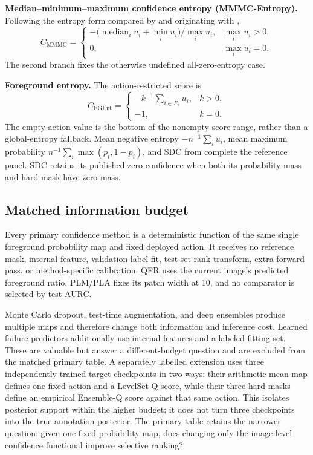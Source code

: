 \noindent\textbf{Median--minimum--maximum confidence entropy (MMMC-Entropy).}
Following the entropy form compared by \citet{sdc} and originating with
\citet{holder2021uncertainty},
\[
 C_{\mathrm{MMMC}}=
 \begin{cases}
 -\bigl(\operatorname{median}_i u_i+\min_i u_i\bigr)/\max_i u_i,
   & \max_i u_i>0,\\
 0, & \max_i u_i=0.
 \end{cases}
\]
The second branch fixes the otherwise undefined all-zero-entropy case.

\noindent\textbf{Foreground entropy.}
The action-restricted score is
\[
 C_{\mathrm{FGEnt}}=
 \begin{cases}
  -k^{-1}\sum_{i\in F_\gamma}u_i, & k>0,\\
  -1, & k=0.
 \end{cases}
\]
The empty-action value is the bottom of the nonempty score range, rather than a
global-entropy fallback. Mean negative entropy
\(-n^{-1}\sum_i u_i\), mean maximum probability
\(n^{-1}\sum_i\max(p_i,1-p_i)\), and SDC from
 complete the reference panel. SDC retains its published
zero confidence when both its probability mass and hard mask have zero mass.

\subsection{Matched information budget}

Every primary confidence method is a deterministic function of the same single
foreground probability map and fixed deployed action. It receives no reference
mask, internal feature, validation-label fit, test-set rank transform, extra
forward pass, or method-specific calibration. QFR uses the current image's
predicted foreground ratio, PLM/PLA fixes its patch width at 10, and no comparator
is selected by test AURC.

Monte Carlo dropout, test-time augmentation, and deep ensembles produce multiple
maps and therefore change both information and inference cost. Learned failure
predictors additionally use internal features and a labeled fitting set. These
are valuable but answer a different-budget question and are excluded from the
matched primary table. A separately labelled extension uses three independently
trained target checkpoints in two ways: their arithmetic-mean map defines one
fixed action and a LevelSet-Q score, while their three hard masks define an
empirical Ensemble-Q score against that same action. This isolates posterior
support within the higher budget; it does not turn three checkpoints into the
true annotation posterior. The primary table retains the narrower question:
given one fixed probability map, does changing only the image-level confidence
functional improve selective ranking?

